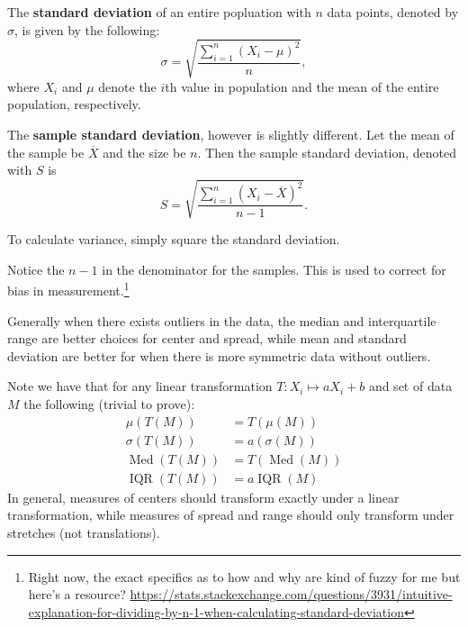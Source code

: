 \begin{blackbox}
    \begin{definition}
        The \textbf{standard deviation} of an entire popluation with \( n \) data points, denoted by \( \sigma \), is given by the following:
        \[
            \sigma = \sqrt{\frac{\sum_{i = 1}^n \left( X_i - \mu  \right)^2}{n}},
        \]
        where \( X_i \) and \( \mu \) denote the \( i \)th value in population
        and the mean of the entire population, respectively.

        The \textbf{sample standard deviation}, however is slightly different. Let the mean of the sample be \( \overline{X} \) and the size be \( n \). Then the sample standard deviation, denoted with \( S \) is
        \[
            S = \sqrt{\frac{\sum_{i = 1}^n \left( X_i - \overline{X} \right)^2}{n - 1}}.
        \]

        To calculate variance, simply square the standard deviation.
    \end{definition}
\end{blackbox}

Notice the \( n - 1 \) in the denominator for the samples. This is used to
correct for bias in measurement.\footnote{Right now, the exact specifics as to
how and why are kind of fuzzy for me but here's a resource?
\url{https://stats.stackexchange.com/questions/3931/intuitive-explanation-for-dividing-by-n-1-when-calculating-standard-deviation}}

Generally when there exists outliers in the data, the median and interquartile
range are better choices for center and spread, while mean and standard
deviation are better for when there is more symmetric data without outliers.

Note we have that for any linear transformation \( T \colon X_i \mapsto a X_i +
b \) and set of data \( M \) the following (trivial to prove):
\begin{align*}
    \mu \left( T \left( M \right) \right) &= T \left( \mu \left( M \right) \right) \\
    \sigma \left( T \left( M \right) \right) &= a \left( \sigma \left( M \right) \right) \\
    \operatorname{Med} \left( T \left( M \right) \right) &= T \left( \operatorname{Med} \left( M \right) \right) \\
    \operatorname{IQR} \left( T \left( M \right) \right) &= a \operatorname{IQR} \left( M \right)
\end{align*}
In general, measures of centers should transform exactly under a linear
transformation, while measures of spread and range should only transform under
stretches (not translations).


